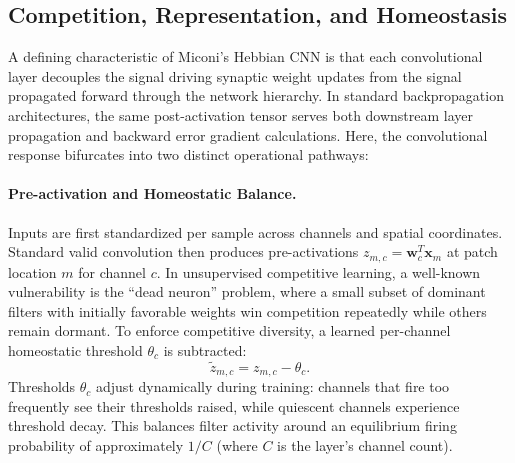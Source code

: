 \documentclass{article}
\begin{document}
    \subsection{Competition, Representation, and Homeostasis}
    
    A defining characteristic of Miconi's Hebbian CNN is that each convolutional layer decouples the signal driving synaptic weight updates from the signal propagated forward through the network hierarchy. In standard backpropagation architectures, the same post-activation tensor serves both downstream layer propagation and backward error gradient calculations. Here, the convolutional response bifurcates into two distinct operational pathways:
    
    \paragraph{Pre-activation and Homeostatic Balance.}
    Inputs are first standardized per sample across channels and spatial coordinates. Standard valid convolution then produces pre-activations $z_{m,c} = \mathbf{w}_c^T \mathbf{x}_m$ at patch location $m$ for channel $c$. In unsupervised competitive learning, a well-known vulnerability is the ``dead neuron'' problem, where a small subset of dominant filters with initially favorable weights win competition repeatedly while others remain dormant. To enforce competitive diversity, a learned per-channel homeostatic threshold $\theta_c$ is subtracted:
    \begin{equation}
    \tilde{z}_{m,c} = z_{m,c} - \theta_c.
    \end{equation}
    Thresholds $\theta_c$ adjust dynamically during training: channels that fire too frequently see their thresholds raised, while quiescent channels experience threshold decay. This balances filter activity around an equilibrium firing probability of approximately $1/C$ (where $C$ is the layer's channel count).
    
\end{document}
